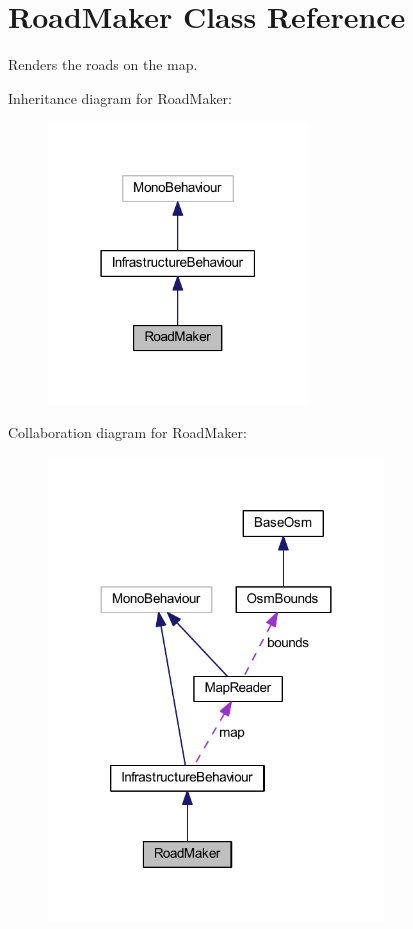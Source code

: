 \hypertarget{class_road_maker}{}\section{Road\+Maker Class Reference}
\label{class_road_maker}


Renders the roads on the map.  




Inheritance diagram for Road\+Maker\+:\nopagebreak
\begin{figure}[H]
\begin{center}
\leavevmode
\includegraphics[width=195pt]{class_road_maker__inherit__graph}
\end{center}
\end{figure}


Collaboration diagram for Road\+Maker\+:\nopagebreak
\begin{figure}[H]
\begin{center}
\leavevmode
\includegraphics[width=252pt]{class_road_maker__coll__graph}
\end{center}
\end{figure}

